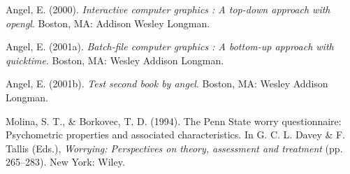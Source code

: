 \documentclass[12pt,oneside]{chicagocapstone}
\begin{document}
\hypertarget{refs}{}
\hypertarget{ref-angel2000}{}
Angel, E. (2000). \emph{Interactive computer graphics : A top-down
approach with opengl}. Boston, MA: Addison Wesley Longman.

\hypertarget{ref-angel2001}{}
Angel, E. (2001a). \emph{Batch-file computer graphics : A bottom-up
approach with quicktime}. Boston, MA: Wesley Addison Longman.

\hypertarget{ref-angel2002a}{}
Angel, E. (2001b). \emph{Test second book by angel}. Boston, MA: Wesley
Addison Longman.

\hypertarget{ref-Molina1994}{}
Molina, S. T., \& Borkovec, T. D. (1994). The Penn State worry
questionnaire: Psychometric properties and associated characteristics.
In G. C. L. Davey \& F. Tallis (Eds.), \emph{Worrying: Perspectives on
theory, assessment and treatment} (pp. 265--283). New York: Wiley.


\end{document}
